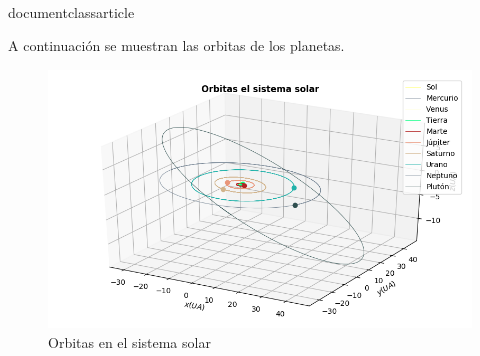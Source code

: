 \\documentclass{article}
\begin{document}
A continuación se muestran las orbitas de los planetas.

\begin{figure}[h!]
\centering
\includegraphics[scale=0.45]{grafica_p_1.png}
\caption{Orbitas en el sistema solar}
\end{figure}
\end{document}
